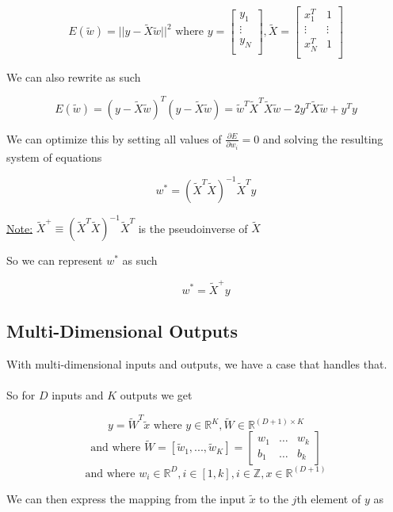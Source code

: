 \documentclass[12pt]{article}
\begin{document}
$$E(\tilde{w}) = || y - \tilde{X}\tilde{w}||^2 \text{ where } y = \begin{bmatrix}
   y_{1} \\
   \vdots \\
   y_{N}\\
 \end{bmatrix}, \tilde{X} = \begin{bmatrix}
   x^T_{1} & 1 \\
   \vdots & \vdots \\
   x^T_{N} & 1\\
 \end{bmatrix}$$
 
We can also rewrite as such

$$E(\tilde{w}) = (y - \tilde{X}\tilde{w})^T (y - \tilde{X}\tilde{w}) = \tilde{w}^T\tilde{X}^T\tilde{X}\tilde{w} - 2y^T\tilde{X}\tilde{w} + y^T y$$

We can optimize this by setting all values of $\frac{\partial E}{\partial w_i} = 0$ and solving the resulting system of equations

$$w^* = (\tilde{X}^T \tilde{X})^{-1} \tilde{X}^T y$$


\underline{Note:} $\tilde{X}^+ \equiv (\tilde{X}^T \tilde{X})^{-1} \tilde{X}^T$ is the pseudoinverse of $\tilde{X}$

So we can represent $w^*$ as such

$$w^* = \tilde{X}^+ y$$

\subsection{Multi-Dimensional Outputs}

With multi-dimensional inputs and outputs, we have a case that handles that.
\\
\\
So for $D$ inputs and $K$ outputs we get

$$y = \tilde{W}^T \tilde{x} \text{ where } y\in\mathbb{R}^K, \tilde{W} \in\mathbb{R}^{(D+1) \times K}$$
$$\text{and where } \tilde{W} = [\tilde{w}_1,...,\tilde{w}_K] = \begin{bmatrix}
    w_1 & \dots & w_k\\
    b_1 & \dots & b_k
\end{bmatrix}$$
$$\text{and where } w_i \in\mathbb{R}^D, i\in [1,k], i\in\mathbb{Z}, x \in \mathbb{R}^{(D+1)}$$

We can then express the mapping from the input $\tilde{x}$ to the $j$th element of $y$ as
\end{document}

